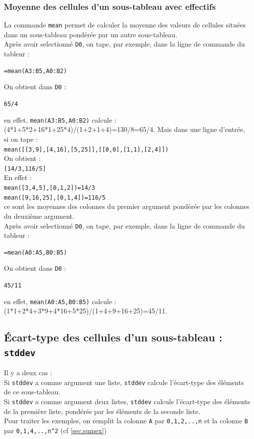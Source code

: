 \documentclass[a4paper,11pt]{book}
\begin{document}
\subsubsection{Moyenne des cellules d'un sous-tableau avec effectifs}
La commande {\tt mean} permet de calculer la moyenne des valeurs de cellules
 situ\'ees dans un sous-tableau pond\'er\'ee par un autre sous-tableau.\\ 
Apr\`es avoir selectionn\'e {\tt D0}, on tape, par exemple, dans la ligne de 
commande du tableur :
\begin{center}{\tt =mean(A3:B5,A0:B2)}\end{center}
 On obtient dans {\tt D0} :
\begin{center}{\tt 65/4}\end{center}
en effet, {\tt mean(A3:B5,A0:B2)} calcule :\\
(4*1+5*2+16*1+25*4)/(1+2+1+4)=130/8=65/4.
Mais dans une ligne d'entr\'ee, si on tape :\\
{\tt mean([[3,9],[4,16],[5,25]],[[0,0],[1,1],[2,4]])}\\
On obtient :\\
{\tt [14/3,116/5]}\\
En effet :\\
{\tt mean([3,4,5],[0,1,2])=14/3}\\
{\tt mean([9,16,25],[0,1,4])=116/5}\\
ce sont les moyennes des colonnes du premier argument pond\'er\'ee par les 
colonnes du deuxi\`eme argument.\\
Apr\`es avoir selectionn\'e {\tt D0}, on tape, par exemple, dans la ligne de 
commande du tableur :
\begin{center}{\tt =mean(A0:A5,B0:B5)}\end{center}
 On obtient dans {\tt D0} :
\begin{center}{\tt 45/11}\end{center}
en effet, {\tt mean(A0:A5,B0:B5)} calcule :\\
(1*1+2*4+3*9+4*16+5*25)/(1+4+9+16+25)=45/11.
\subsection{\'Ecart-type des cellules d'un sous-tableau : {\tt stddev}}\label{sec:stddev}
Il y a deux cas :\\
Si {\tt stddev} a comme argument une liste, {\tt stddev} 
calcule l'\'ecart-type des \'el\'ements de ce sous-tableau.\\
Si {\tt stddev} a comme argument deux listes, {\tt stddev} calcule 
l'\'ecart-type  des \'el\'ements de la premi\`ere liste, pond\'er\'es par les 
\'el\'ements de la seconde liste.\\
Pour traiter les exemples,  on remplit la colonne {\tt A} par 
{\tt 0,1,2,..,n} et la colonne 
{\tt B} par {\tt 0,1,4,..,n\verb|^|2} (cf \ref{sec:sumex}) 
\end{document}
